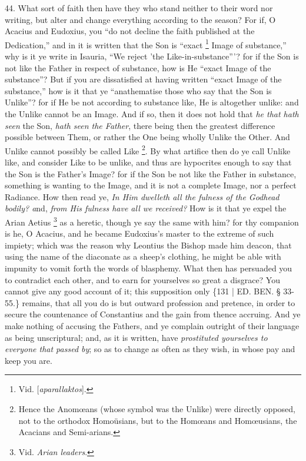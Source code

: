 44. What sort of faith then
have they who stand neither to their word nor writing, but alter and
change everything according to the season? For if, O Acacius and
Eudoxius, you ``do not decline the faith published at the Dedication,''
and in it is written that the Son is ``exact \footnote{Vid. [\emph{aparallaktos}].} Image of substance,'' why is it ye write in Isauria, ``We reject
'the Like-in-substance'''? for if the Son is not like the Father in
respect of substance, how is He ``exact Image of the substance''? But if
you are dissatisfied at having written ``exact Image of the substance,''
how is it that ye ``anathematise those who say that the Son is Unlike''?
for if He be not according to substance like, He is altogether unlike:
and the Unlike cannot be an Image. And if so, then it does not hold
that \emph{he that hath seen} the Son, \emph{hath seen the Father},
there being then the greatest difference possible between Them, or
rather the One being wholly Unlike the Other. And Unlike cannot
possibly be called Like \footnote{Hence the Anomœans (whose symbol was the Unlike) were directly
opposed, not to the orthodox Homoüsians, but to the Homœans and Homœusians,
the Acacians and Semi-arians.}.
By what artifice then do ye call Unlike like, and consider Like to be
unlike, and thus are hypocrites enough to say that the Son is the
Father's Image? for if the Son be not like the Father in substance,
something is wanting to the Image, and it is not a complete Image, nor
a perfect Radiance. How then read ye, \emph{In Him dwelleth all the
fulness of the Godhead bodily? a}nd, \emph{from His fulness have all we
received?} How is it that ye expel the Arian Aetius \footnote{Vid. \emph{Arian leaders}.} as a heretic, though ye say the same with him? for thy
companion is he, O Acacius, and he became Eudoxius's master to the
extreme of such impiety; which was the reason why Leontius the Bishop
made him deacon, that using the name of the diaconate as a sheep's
clothing, he might be able with impunity to vomit forth the words of
blasphemy. What then has persuaded you to contradict each other, and
to earn for yourselves so great a disgrace? You cannot give any good
account of it; this supposition only \{131 | ED. BEN.
§ 33-55.\} remains, that all you do is but outward profession and
pretence, in order to secure the countenance of Constantius and the
gain from thence accruing. And ye make nothing of accusing the
Fathers, and ye complain outright of their language as being
unscriptural; and, as it is written, have \emph{prostituted yourselves to
everyone that passed by}; so as to change as often as they wish, in
whose pay and keep you are.

